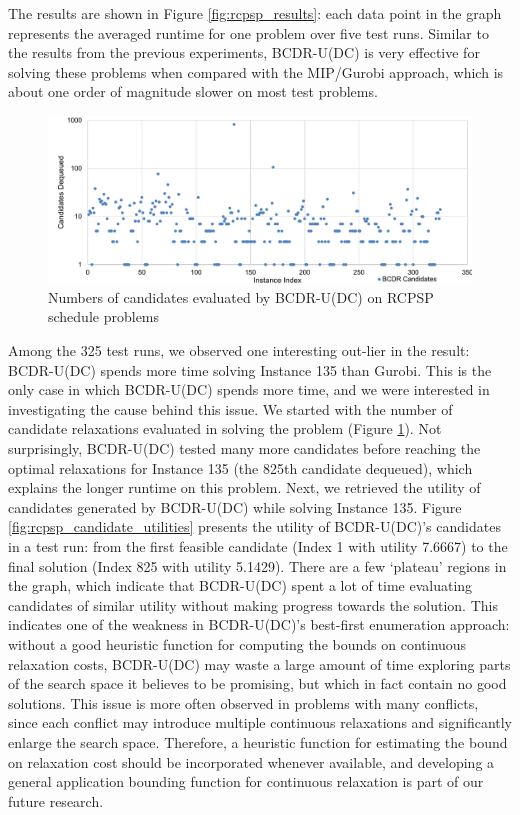 \documentclass[jair,twoside,11pt,theapa]{article}
\begin{document}
The results are shown in Figure \ref{fig:rcpsp_results}: each data point in the
graph represents the averaged runtime for one problem over five test runs. Similar to
the results from the previous experiments, BCDR-U(DC) is very effective for solving
these problems when compared with the MIP/Gurobi approach, which is about one
order of magnitude slower on most test problems.


\begin{figure}[htb]
	\centering
	\includegraphics[width=1.0\textwidth]{figures/results/rcpsp_candidates.pdf}
	\caption{Numbers of candidates evaluated by BCDR-U(DC) on RCPSP schedule problems}
	\label{fig:rcpsp_candidates}
\end{figure}


Among the 325 test runs, we observed one interesting out-lier in the result:
BCDR-U(DC) spends more time solving Instance 135 than Gurobi. This is the
only case in which BCDR-U(DC) spends more time, and we were interested in
investigating the cause behind this issue. We started with the number of
candidate relaxations evaluated in solving the problem (Figure
\ref{fig:rcpsp_candidates}). Not surprisingly, BCDR-U(DC) tested many more
candidates before reaching the optimal relaxations for Instance 135 (the 825th
candidate dequeued), which explains the longer runtime on this problem. Next, we
retrieved the utility of candidates generated by BCDR-U(DC) while solving
Instance 135. Figure \ref{fig:rcpsp_candidate_utilities} presents the utility
of BCDR-U(DC)'s candidates in a test run: from the first feasible candidate
(Index 1 with utility 7.6667) to the final solution (Index 825 with utility
5.1429). There are a few `plateau' regions in the graph, which indicate that
BCDR-U(DC) spent a lot of time evaluating candidates of similar utility without
making progress towards the solution. This indicates one of the weakness in
BCDR-U(DC)'s best-first enumeration approach: without a good heuristic function
for computing the bounds on continuous relaxation costs, BCDR-U(DC) may waste a
large amount of time exploring parts of the search space it believes to be
promising, but which in fact contain no good solutions. This issue is more often
observed in problems with many conflicts, since each conflict may introduce
multiple continuous relaxations and significantly enlarge the search space.
Therefore, a heuristic function for estimating the bound on relaxation cost
should be incorporated whenever available, and developing a general application
bounding function for continuous relaxation is part of our future research.
\end{document}
